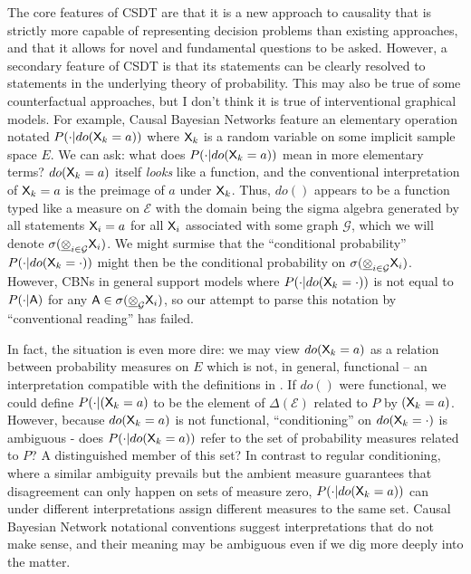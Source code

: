 
The core features of CSDT are that it is a new approach to causality that is strictly more capable of representing decision problems than existing approaches, and that it allows for novel and fundamental questions to be asked. However, a secondary feature of CSDT is that its statements can be clearly resolved to statements in the underlying theory of probability. This may also be true of some counterfactual approaches, but I don't think it is true of interventional graphical models. For example, Causal Bayesian Networks feature an elementary operation notated $P(\cdot|do(\mathsf{X}_k=a))$ where $\mathsf{X}_k$ is a random variable on some implicit sample space $E$. We can ask: what does $P(\cdot|do(\mathsf{X}_k=a))$ mean in more elementary terms? $do(\mathsf{X}_k=a)$ itself \emph{looks} like a function, and the conventional interpretation of $\mathsf{X}_k=a$ is the preimage of $a$ under $\mathsf{X}_k$. Thus, $do()$ appears to be a function typed like a measure on $\mathcal{E}$ with the domain being the sigma algebra generated by all statements $\mathsf{X}_i=a$ for all $\mathsf{X}_i$ associated with some graph $\mathcal{G}$, which we will denote $\sigma(\underline{\otimes}_{i\in \mathcal{G}} \mathsf{X}_i)$. We might surmise that the ``conditional probability'' $P(\cdot|do(\mathsf{X}_k=\cdot))$ might then be the conditional probability on $\sigma(\underline{\otimes}_{i\in \mathcal{G}} \mathsf{X}_i)$. However, CBNs in general support models where $P(\cdot|do(\mathsf{X}_k=\cdot))$ is not equal to $P(\cdot|\mathsf{A})$ for any $\mathsf{A}\in \sigma(\underline{\otimes}_\mathcal{G} \mathsf{X}_i)$, so our attempt to parse this notation by ``conventional reading'' has failed.

In fact, the situation is even more dire: we may view $do(\mathsf{X}_k=a)$ as a relation between probability measures on $E$ which is not, in general, functional -- an interpretation compatible with the definitions in \citet{pearl_causality:_2009}. If $do()$ were functional, we could define $P(\cdot|\do(\RV{X}_k=a)$ to be the element of $\Delta(\mathcal{E})$ related to $P$ by $\do(\RV{X}_k=a)$. However, because $do(\mathsf{X}_k=a)$ is not functional, ``conditioning'' on $do(\mathsf{X}_k=\cdot)$ is ambiguous - does $P(\cdot|do(\mathsf{X}_k=a))$ refer to the set of probability measures related to $P$? A distinguished member of this set? In contrast to regular conditioning, where a similar ambiguity prevails but the ambient measure guarantees that disagreement can only happen on sets of measure zero, $P(\cdot|do(\mathsf{X}_k=a))$ can under different interpretations assign different measures to the same set. Causal Bayesian Network notational conventions suggest interpretations that do not make sense, and their meaning may be ambiguous even if we dig more deeply into the matter.

